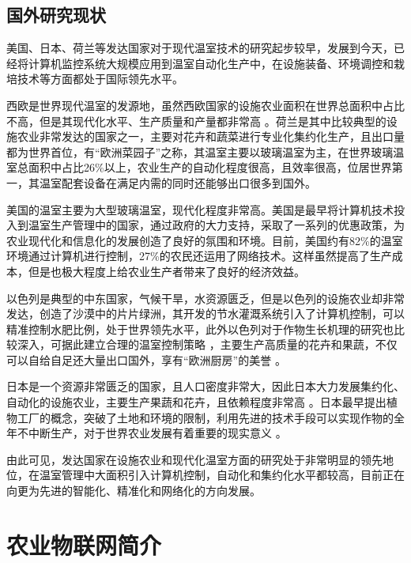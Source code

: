 	\subsection{国外研究现状}
美国、日本、荷兰等发达国家对于现代温室技术的研究起步较早，发展到今天，已经将计算机监控系统大规模应用到温室自动化生产中，在设施装备、环境调控和栽培技术等方面都处于国际领先水平。
	
西欧是世界现代温室的发源地，虽然西欧国家的设施农业面积在世界总面积中占比不高，但是其现代化水平、生产质量和产量都非常高\supercite{GuoShirong2012NJNY} 。荷兰是其中比较典型的设施农业非常发达的国家之一，主要对花卉和蔬菜进行专业化集约化生产，且出口量都为世界首位，有“欧洲菜园子”之称，其温室主要以玻璃温室为主，在世界玻璃温室总面积中占比26\%以上\supercite{Watson2010,JiHong2007}，农业生产的自动化程度很高，且效率很高，位居世界第一\supercite{QinLiu2015}，其温室配套设备在满足内需的同时还能够出口很多到国外\supercite{Tavoletti2008}。

美国的温室主要为大型玻璃温室，现代化程度非常高。美国是最早将计算机技术投入到温室生产管理中的国家，通过政府的大力支持，采取了一系列的优惠政策，为农业现代化和信息化的发展创造了良好的氛围和环境。目前，美国约有82\%的温室环境通过计算机进行控制，27\%的农民还运用了网络技术\supercite{Kacira2011}。这样虽然提高了生产成本，但是也极大程度上给农业生产者带来了良好的经济效益\supercite{GuoShirong2012NJNY}。

以色列是典型的中东国家，气候干旱，水资源匮乏，但是以色列的设施农业却非常发达，创造了沙漠中的片片绿洲，其开发的节水灌溉系统引入了计算机控制，可以精准控制水肥比例，处于世界领先水平，此外以色列对于作物生长机理的研究也比较深入，可据此建立合理的温室控制策略\supercite{GuoShirong2012NJNY,TangLibiao2003} ，主要生产高质量的花卉和果蔬，不仅可以自给自足还大量出口国外，享有“欧洲厨房”的美誉\supercite{QinLiu2015} 。

日本是一个资源非常匮乏的国家，且人口密度非常大，因此日本大力发展集约化、自动化的设施农业，主要生产果蔬和花卉，且依赖程度非常高\supercite{YangChunjun2010} 。日本最早提出植物工厂的概念，突破了土地和环境的限制，利用先进的技术手段可以实现作物的全年不中断生产，对于世界农业发展有着重要的现实意义\supercite{HuYongguang2002} 。

由此可见，发达国家在设施农业和现代化温室方面的研究处于非常明显的领先地位，在温室管理中大面积引入计算机控制，自动化和集约化水平都较高，目前正在向更为先进的智能化、精准化和网络化的方向发展。

\section{农业物联网简介}
